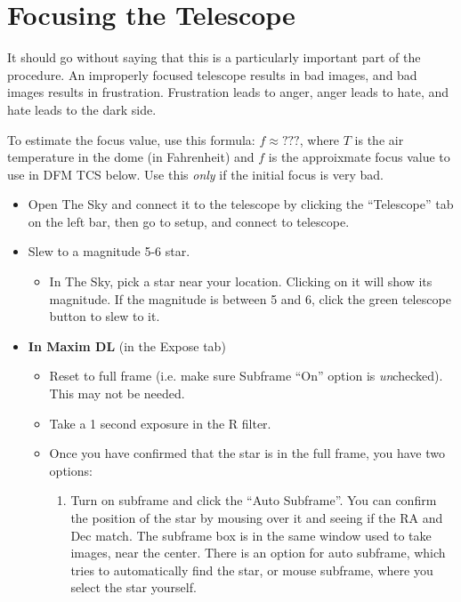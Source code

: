 \documentclass[letterpaper, 12pt]{report}
\begin{document}
\newpage

\chapter{Focusing the Telescope}
\label{ch:focusing}
It should go without saying that this is a particularly important part of the procedure. An improperly focused telescope results in bad images, and bad images results in frustration. Frustration leads to anger, anger leads to hate, and hate leads to the dark side.

To estimate the focus value, use this formula: $f \approx ???$, where $T$ is the air temperature in the dome (in Fahrenheit) and $f$ is the approixmate focus value to use in DFM TCS below. Use this \emph{only} if the initial focus is very bad.

\begin{itemize}
	\item Open The Sky and connect it to the telescope by clicking the ``Telescope'' tab on the left bar, then go to setup, and connect to telescope.
	\item Slew to a magnitude 5-6 star.
	\begin{itemize}
		\item In The Sky, pick a star near your location. Clicking on it will show its magnitude. If the magnitude is between 5 and 6, click the green telescope button to slew to it.
	\end{itemize}
	\item {\large \textbf{In Maxim DL} (in the Expose tab)}
	\begin{itemize}
		\item Reset to full frame (i.e. make sure Subframe ``On'' option is \emph{un}checked). This may not be needed.
		\item Take a 1 second exposure in the R filter.
	\end{itemize}
	\begin{itemize}
		\item Once you have confirmed that the star is in the full frame, you have two options:
		\begin{enumerate}
			\item Turn on subframe and click the ``Auto Subframe''. You can confirm the position of the star by mousing over it and seeing if the RA and Dec match. The subframe box is in the same window used to take images, near the center. There is an option for auto subframe, which tries to automatically find the star, or mouse subframe, where you select the star yourself.

\end{enumerate}
\end{itemize}
\end{itemize}
\end{document}
